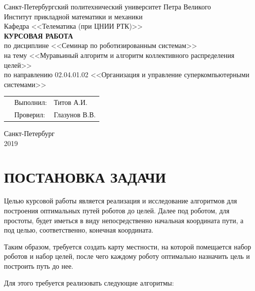 \documentclass{article}
\numberwithin{equation}{section}
\begin{document}
    \thispagestyle{empty}
	\begin{center}
		Санкт-Петербургский политехнический университет Петра Великого\\
		Институт прикладной математики и механики\\
		Кафедра <<Телематика (при ЦНИИ РТК)>>\\
		\vspace*{\fill}
		\textbf{\Large{КУРСОВАЯ РАБОТА}}\\
		\vspace{0.5cm}
        \large{по дисциплине <<Семинар по роботизированным системам>>\\}
        \large{на тему <<Муравьиный алгоритм и алгоритм коллективного распределения целей>>}\\
        \vspace{1cm}
        по направлению 02.04.01.02 <<Организация и управление суперкомпьютерными системами>>
	\end{center}
	\vspace{3cm}
	\begin{tabular} {l l l}
	\hspace{10cm} & Выполнил: & Титов А.И.\\
	& Проверил: & Глазунов В.В.
	\end{tabular}
	\vspace*{\fill}
	\begin{center}
		Санкт-Петербург\\
		2019
    \end{center}
    \newpage


	\renewcommand\contentsname{Оглавление}
	\tableofcontents

	\newpage
	\section*{ПОСТАНОВКА ЗАДАЧИ}

	Целью курсовой работы является реализация и исследование алгоритмов для построения оптимальных путей роботов до целей. Далее под роботом, для простоты, будет иметься в виду непосредственно начальная координата пути, а под целью, соответственно, конечная координата.

	Таким образом, требуется создать карту местности, на которой помещается набор роботов и набор целей, после чего каждому роботу оптимально назначить цель и построить путь до нее.

	Для этого требуется реализовать следующие алгоритмы:
\end{document}
